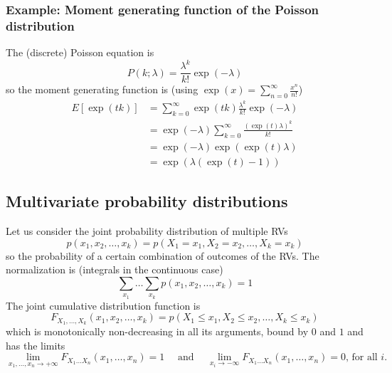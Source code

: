 \subsubsection{Example: Moment generating function of the Poisson distribution}
The (discrete) Poisson equation is
\begin{equation}
    P(k;\lambda) = \frac{\lambda^k}{k!} \exp{(-\lambda)}
\end{equation}
so the moment generating function is (using $\exp(x) = \sum_{n=0}^{\infty} \frac{x^n}{n!}$)
\begin{equation}
    \begin{aligned}
        E[\exp(tk)] &= \sum_{k=0}^{\infty} \exp(tk) \frac{\lambda^k}{k!} \exp{(-\lambda)} \\
         &= \exp{(-\lambda)} \sum_{k=0}^{\infty} \frac{\left(\exp(t)\lambda\right)^k}{k!} \\
         &= \exp{(-\lambda)} \exp{\left(\exp(t)\lambda\right)} \\
         &= \exp{\left(\lambda(\exp(t)-1)\right)}
    \end{aligned}
\end{equation}

\subsection{Multivariate probability distributions}
Let us consider the joint probability distribution of multiple RVs
\begin{equation}
    p(x_1, x_2, \dots, x_k) = p(X_1=x_1, X_2=x_2, \dots, X_k=x_k)
\end{equation}
so the probability of a certain combination of outcomes of the RVs.
The normalization is (integrals in the continuous case)
\begin{equation}
    \sum_{x_1} \dots \sum_{x_k} p(x_1, x_2, \dots, x_k) = 1
\end{equation}
The joint cumulative distribution function is
\begin{equation}
    F_{X_1,\dots,X_k}(x_1, x_2, \dots, x_k) = p(X_1 \leq x_1, X_2 \leq x_2, \dots, X_k \leq x_k)
\end{equation}
which is monotonically non-decreasing in all its arguments, bound by $0$ and $1$ and has the limits
\begin{equation}
    \lim _{x_1, \ldots, x_n \rightarrow+\infty} F_{X_1 \ldots X_n}\left(x_1, \ldots, x_n\right)=1 \quad \text { and } \quad \lim _{x_i \rightarrow-\infty} F_{X_1 \ldots X_n}\left(x_1, \ldots, x_n\right)=0 \text {, for all } i \text {. }
\end{equation}

